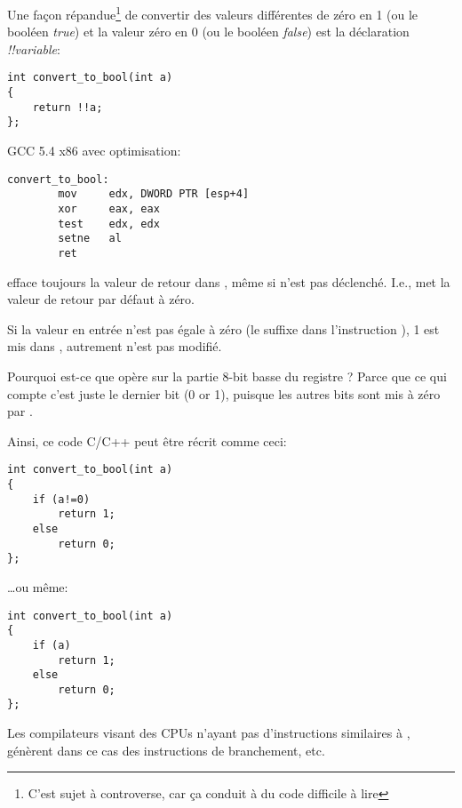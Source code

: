 
Une façon répandue\footnote{C'est sujet à controverse, car ça conduit à du code difficile
à lire} de convertir des valeurs différentes de zéro en 1 (ou le booléen \emph{true})
et la valeur zéro en 0 (ou le booléen \emph{false}) est la déclaration \emph{!!variable}:

\begin{lstlisting}[style=customc]
int convert_to_bool(int a)
{
	return !!a;
};
\end{lstlisting}

GCC 5.4 x86 avec optimisation:

\begin{lstlisting}[style=customasmx86]
convert_to_bool:
        mov     edx, DWORD PTR [esp+4]
        xor     eax, eax
        test    edx, edx
        setne   al
        ret
\end{lstlisting}

 efface toujours la valeur de retour dans \EAX, même si  n'est
pas déclenché. I.e.,  met la valeur de retour par défaut à zéro.

Si la valeur en entrée n'est pas égale à zéro (le suffixe  dans l'instruction
), 1 est mis dans \AL, autrement \AL n'est pas modifié.

Pourquoi est-ce que  opère sur la partie 8-bit basse du registre \EAX?
Parce que ce qui compte c'est juste le dernier bit (0 or 1), puisque les autres bits
sont mis à zéro par .

Ainsi, ce code C/C++ peut être récrit comme ceci:

\begin{lstlisting}[style=customc]
int convert_to_bool(int a)
{
	if (a!=0)
		return 1;
	else
		return 0;
};
\end{lstlisting}

\dots ou même:

\begin{lstlisting}[style=customc]
int convert_to_bool(int a)
{
	if (a)
		return 1;
	else
		return 0;
};
\end{lstlisting}

Les compilateurs visant des \ac{CPU}s n'ayant pas d'instructions similaires à ,
génèrent dans ce cas des instructions de branchement, etc.
